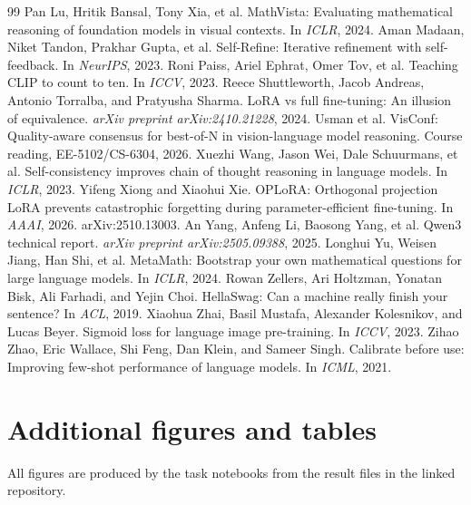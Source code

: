 \documentclass{article}
\begin{document}
\begin{thebibliography}{99}
 Pan Lu, Hritik Bansal, Tony Xia, et al. MathVista: Evaluating mathematical reasoning of foundation models in visual contexts. In \emph{ICLR}, 2024.
 Aman Madaan, Niket Tandon, Prakhar Gupta, et al. Self-Refine: Iterative refinement with self-feedback. In \emph{NeurIPS}, 2023.
 Roni Paiss, Ariel Ephrat, Omer Tov, et al. Teaching CLIP to count to ten. In \emph{ICCV}, 2023.
 Reece Shuttleworth, Jacob Andreas, Antonio Torralba, and Pratyusha Sharma. LoRA vs full fine-tuning: An illusion of equivalence. \emph{arXiv preprint arXiv:2410.21228}, 2024.
 Usman et al. VisConf: Quality-aware consensus for best-of-N in vision-language model reasoning. Course reading, EE-5102/CS-6304, 2026.
 Xuezhi Wang, Jason Wei, Dale Schuurmans, et al. Self-consistency improves chain of thought reasoning in language models. In \emph{ICLR}, 2023.
 Yifeng Xiong and Xiaohui Xie. OPLoRA: Orthogonal projection LoRA prevents catastrophic forgetting during parameter-efficient fine-tuning. In \emph{AAAI}, 2026. arXiv:2510.13003.
 An Yang, Anfeng Li, Baosong Yang, et al. Qwen3 technical report. \emph{arXiv preprint arXiv:2505.09388}, 2025.
 Longhui Yu, Weisen Jiang, Han Shi, et al. MetaMath: Bootstrap your own mathematical questions for large language models. In \emph{ICLR}, 2024.
 Rowan Zellers, Ari Holtzman, Yonatan Bisk, Ali Farhadi, and Yejin Choi. HellaSwag: Can a machine really finish your sentence? In \emph{ACL}, 2019.
 Xiaohua Zhai, Basil Mustafa, Alexander Kolesnikov, and Lucas Beyer. Sigmoid loss for language image pre-training. In \emph{ICCV}, 2023.
 Zihao Zhao, Eric Wallace, Shi Feng, Dan Klein, and Sameer Singh. Calibrate before use: Improving few-shot performance of language models. In \emph{ICML}, 2021.
\end{thebibliography}

\newpage
\appendix
\section{Additional figures and tables}
All figures are produced by the task notebooks from the result files in the linked repository.
\end{document}
